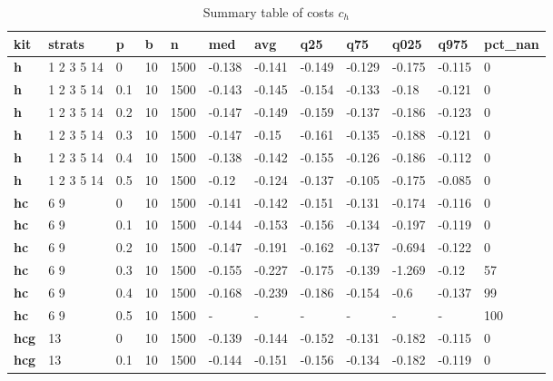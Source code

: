 \begin{longtable}[h]{|p{0.8cm}|p{1.5cm}|p{1cm}|p{1cm}|p{1cm}|p{1cm}|p{1cm}|p{1cm}|p{1cm}|p{1cm}|p{1cm}|p{1.5cm}|}
\caption{Summary table of costs $c_h$}
\label{tab:costs_mod_h} \\
      \hline
\textbf{ kit} & \textbf{ strats} & \textbf{ p} & \textbf{ b} & \textbf{ n} & \textbf{ med} & \textbf{ avg} & \textbf{ q25} & \textbf{ q75} & \textbf{ q025} & \textbf{ q975} & \textbf{ pct\_nan}
    \\ \hline
  \textbf{h   } &  1 2 3 5 14 &   0 & 10 & 1500 & -0.138 & -0.141 & -0.149 & -0.129 & -0.175 & -0.115 &   0
    \\ \hline
  \textbf{h   } &  1 2 3 5 14 & 0.1 & 10 & 1500 & -0.143 & -0.145 & -0.154 & -0.133 &  -0.18 & -0.121 &   0
    \\ \hline
  \textbf{h   } &  1 2 3 5 14 & 0.2 & 10 & 1500 & -0.147 & -0.149 & -0.159 & -0.137 & -0.186 & -0.123 &   0
    \\ \hline
  \textbf{h   } &  1 2 3 5 14 & 0.3 & 10 & 1500 & -0.147 &  -0.15 & -0.161 & -0.135 & -0.188 & -0.121 &   0
    \\ \hline
  \textbf{h   } &  1 2 3 5 14 & 0.4 & 10 & 1500 & -0.138 & -0.142 & -0.155 & -0.126 & -0.186 & -0.112 &   0
    \\ \hline
  \textbf{h   } &  1 2 3 5 14 & 0.5 & 10 & 1500 &  -0.12 & -0.124 & -0.137 & -0.105 & -0.175 & -0.085 &   0
    \\ \hline
  \textbf{hc  } &  6 9        &   0 & 10 & 1500 & -0.141 & -0.142 & -0.151 & -0.131 & -0.174 & -0.116 &   0
    \\ \hline
  \textbf{hc  } &  6 9        & 0.1 & 10 & 1500 & -0.144 & -0.153 & -0.156 & -0.134 & -0.197 & -0.119 &   0
    \\ \hline
  \textbf{hc  } &  6 9        & 0.2 & 10 & 1500 & -0.147 & -0.191 & -0.162 & -0.137 & -0.694 & -0.122 &   0
    \\ \hline
  \textbf{hc  } &  6 9        & 0.3 & 10 & 1500 & -0.155 & -0.227 & -0.175 & -0.139 & -1.269 &  -0.12 &  57
    \\ \hline
  \textbf{hc  } &  6 9        & 0.4 & 10 & 1500 & -0.168 & -0.239 & -0.186 & -0.154 &   -0.6 & -0.137 &  99
    \\ \hline
  \textbf{hc  } &  6 9        & 0.5 & 10 & 1500 & - & - & - & - & - & - & 100
    \\ \hline
  \textbf{hcg } &  13         &   0 & 10 & 1500 & -0.139 & -0.144 & -0.152 & -0.131 & -0.182 & -0.115 &   0
    \\ \hline
  \textbf{hcg } &  13         & 0.1 & 10 & 1500 & -0.144 & -0.151 & -0.156 & -0.134 & -0.182 & -0.119 &   0

\end{longtable}
